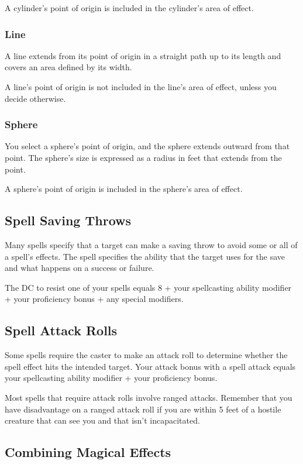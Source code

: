 A cylinder's point of origin is included in the cylinder's area of effect.

\subsubsection{Line}

A line extends from its point of origin in a straight path up to its length and covers an area defined by its width.

A line's point of origin is not included in the line's area of effect, unless you decide otherwise.

\subsubsection{Sphere}

You select a sphere's point of origin, and the sphere extends outward from that point. The sphere's size is expressed as a radius in feet that extends from the point.

A sphere's point of origin is included in the sphere's area of effect.

\subsection{Spell Saving Throws}

Many spells specify that a target can make a saving throw to avoid some or all of a spell's effects. The spell specifies the ability that the target uses for the save and what happens on a success or failure.

The DC to resist one of your spells equals 8 + your spellcasting ability modifier + your proficiency bonus + any special modifiers.

\subsection{Spell Attack Rolls}

Some spells require the caster to make an attack roll to determine whether the spell effect hits the intended target. Your attack bonus with a spell attack equals your spellcasting ability modifier + your proficiency bonus.

Most spells that require attack rolls involve ranged attacks. Remember that you have disadvantage on a ranged attack roll if you are within 5 feet of a hostile creature that can see you and that isn't incapacitated.

\subsection{Combining Magical Effects}


